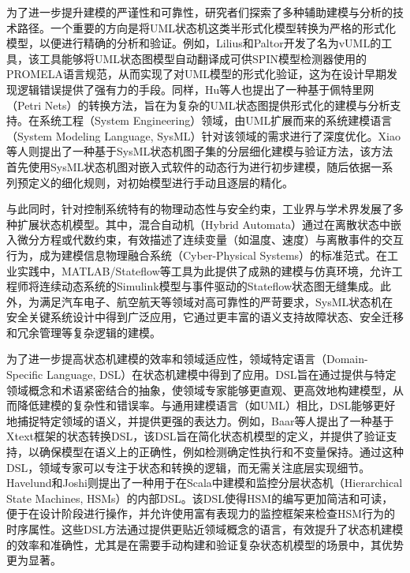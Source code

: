 为了进一步提升建模的严谨性和可靠性，研究者们探索了多种辅助建模与分析的技术路径。一个重要的方向是将UML状态机这类半形式化模型转换为严格的形式化模型，以便进行精确的分析和验证。例如，Lilius和Paltor开发了名为vUML的工具，该工具能够将UML状态图模型自动翻译成可供SPIN模型检测器使用的PROMELA语言规范，从而实现了对UML模型的形式化验证，这为在设计早期发现逻辑错误提供了强有力的手段。同样，Hu等人也提出了一种基于佩特里网（Petri Nets）的转换方法，旨在为复杂的UML状态图提供形式化的建模与分析支持。在系统工程（System Engineering）领域，由UML扩展而来的系统建模语言（System Modeling Language, SysML）针对该领域的需求进行了深度优化。Xiao等人则提出了一种基于SysML状态机图子集的分层细化建模与验证方法，该方法首先使用SysML状态机图对嵌入式软件的动态行为进行初步建模，随后依据一系列预定义的细化规则，对初始模型进行手动且逐层的精化。

与此同时，针对控制系统特有的物理动态性与安全约束，工业界与学术界发展了多种扩展状态机模型。其中，混合自动机（Hybrid Automata）通过在离散状态中嵌入微分方程或代数约束，有效描述了连续变量（如温度、速度）与离散事件的交互行为，成为建模信息物理融合系统（Cyber-Physical Systems）的标准范式。在工业实践中，MATLAB/Stateflow等工具为此提供了成熟的建模与仿真环境，允许工程师将连续动态系统的Simulink模型与事件驱动的Stateflow状态图无缝集成。此外，为满足汽车电子、航空航天等领域对高可靠性的严苛要求，SysML状态机在安全关键系统设计中得到广泛应用，它通过更丰富的语义支持故障状态、安全迁移和冗余管理等复杂逻辑的建模。

为了进一步提高状态机建模的效率和领域适应性，领域特定语言（Domain-Specific Language, DSL）在状态机建模中得到了应用。DSL旨在通过提供与特定领域概念和术语紧密结合的抽象，使领域专家能够更直观、更高效地构建模型，从而降低建模的复杂性和错误率。与通用建模语言（如UML）相比，DSL能够更好地捕捉特定领域的语义，并提供更强的表达力。例如，Baar等人提出了一种基于Xtext框架的状态转换DSL，该DSL旨在简化状态机模型的定义，并提供了验证支持，以确保模型在语义上的正确性，例如检测确定性执行和不变量保持。通过这种DSL，领域专家可以专注于状态和转换的逻辑，而无需关注底层实现细节。Havelund和Joshi则提出了一种用于在Scala中建模和监控分层状态机（Hierarchical State Machines, HSMs）的内部DSL。该DSL使得HSM的编写更加简洁和可读，便于在设计阶段进行操作，并允许使用富有表现力的监控框架来检查HSM行为的时序属性。这些DSL方法通过提供更贴近领域概念的语言，有效提升了状态机建模的效率和准确性，尤其是在需要手动构建和验证复杂状态机模型的场景中，其优势更为显著。

